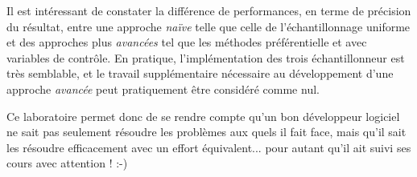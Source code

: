 \documentclass[a4paper,11pt]{article}
\begin{document}
Il est intéressant de constater la différence de performances, en terme de précision du résultat, entre une approche \emph{naïve} telle que celle de l'échantillonnage uniforme et des approches plus \emph{avancées} tel que les méthodes préférentielle et avec variables de contrôle. En pratique, l'implémentation des trois échantillonneur est très semblable, et le travail supplémentaire nécessaire au développement d'une approche \emph{avancée} peut pratiquement être considéré comme nul.

Ce laboratoire permet donc de se rendre compte qu'un bon développeur logiciel ne sait pas seulement résoudre les problèmes aux quels il fait face, mais qu'il sait les résoudre efficacement avec un effort équivalent... pour autant qu'il ait suivi ses cours avec attention ! :-)
\end{document}

